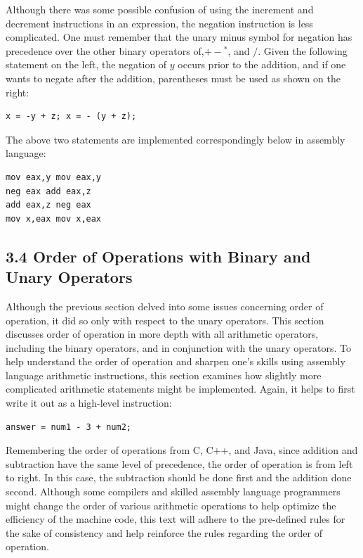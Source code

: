 \documentclass[10pt]{article}
\begin{document}
Although there was some possible confusion of using the increment and decrement instructions in an expression, the negation instruction is less complicated. One must remember that the unary minus symbol for negation has precedence over the other binary operators of,$+-{ }^{*}$, and $/$. Given the following statement on the left, the negation of $y$ occurs prior to the addition, and if one wants to negate after the addition, parentheses must be used as shown on the right:

\begin{verbatim}
x = -y + z; x = - (y + z);
\end{verbatim}

The above two statements are implemented correspondingly below in assembly language:

\begin{verbatim}
mov eax,y mov eax,y
neg eax add eax,z
add eax,z neg eax
mov x,eax mov x,eax
\end{verbatim}

\subsection*{3.4 Order of Operations with Binary and Unary Operators}
Although the previous section delved into some issues concerning order of operation, it did so only with respect to the unary operators. This section discusses order of operation in more depth with all arithmetic operators, including the binary operators, and in conjunction with the unary operators. To help understand the order of operation and sharpen one's skills using assembly language arithmetic instructions, this section examines how slightly more complicated arithmetic statements might be implemented. Again, it helps to first write it out as a high-level instruction:

\begin{verbatim}
answer = num1 - 3 + num2;
\end{verbatim}

Remembering the order of operations from C, C++, and Java, since addition and subtraction have the same level of precedence, the order of operation is from left to right. In this case, the subtraction should be done first and the addition done second. Although some compilers and skilled assembly language programmers might change the order of various arithmetic operations to help optimize the efficiency of the machine code, this text will adhere to the pre-defined rules for the sake of consistency and help reinforce the rules regarding the order of operation.
\end{document}
